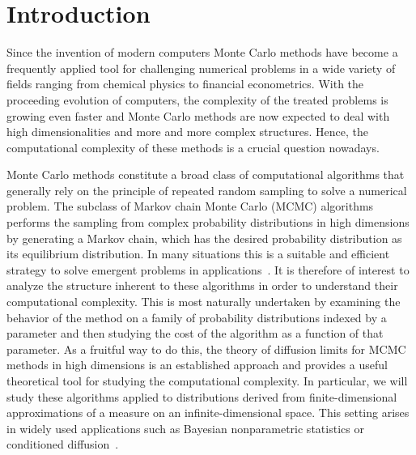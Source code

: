 \chapter{Introduction}
\label{sec:introduction}

Since the invention of modern computers Monte Carlo methods have become a frequently applied tool for challenging numerical problems in a wide variety of fields ranging from chemical physics to financial econometrics. With the proceeding evolution of computers, the complexity of the treated problems is growing even faster and Monte Carlo methods are now expected to deal with high dimensionalities and more and more complex structures. Hence, the computational complexity of these methods is  a crucial question nowadays.

Monte Carlo methods constitute a broad class of computational algorithms that generally rely on the principle of repeated random sampling to solve a numerical problem. The subclass of Markov chain Monte Carlo (MCMC) algorithms~\autocite{Robert2005}  performs the sampling from complex probability distributions in high dimensions by generating a Markov chain, which has the desired probability distribution as its equilibrium distribution. In many situations this is a suitable and efficient strategy to solve emergent problems in applications~\autocite{Liu2004, Robert2005}. It is therefore of interest to analyze the structure inherent to these algorithms in order to understand their computational complexity. This is most naturally undertaken by examining the behavior of the method on a family of probability distributions indexed by a parameter and then studying the cost of the algorithm as a function of that parameter. As a fruitful way to do this, the theory of  diffusion limits for MCMC methods in high dimensions is an established approach and provides a useful theoretical tool for studying the computational complexity. In particular, we will study these algorithms applied to  distributions derived from finite-dimensional approximations of a measure on an infinite-dimensional space. This setting arises in widely used applications such as Bayesian nonparametric statistics or conditioned diffusion~\autocite{Beskos2008, Beskos2009, Dashti2012, Dashti2013, Delyon2006, Hairer2011, Stuart2010}.
\newline

